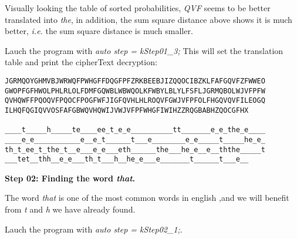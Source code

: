 \begin{center}
\end{center}

\vspace{1em}

Visually looking the table of sorted probabilities, \textit{QVF} seems to be better translated into \textit{the}, in addition, the sum square distance above shows it is much better, \textit{i.e.} the sum square distance is much smaller.


Lauch the program with \textit{auto step = kStep01\_3;} This will set the translation table and print the cipherText decryption:

\begin{center}
\end{center}


\noindent
\begin{Verbatim}[frame=single]
JGRMQOYGHMVBJWRWQFPWHGFFDQGFPFZRKBEEBJIZQQOCIBZKLFAFGQVFZFWWEO
GWOPFGFHWOLPHLRLOLFDMFGQWBLWBWQOLKFWBYLBLYLFSFLJGRMQBOLWJVFPFW
QVHQWFFPQOQVFPQOCFPOGFWFJIGFQVHLHLROQVFGWJVFPFOLFHGQVQVFILEOGQ
ILHQFQGIQVVOSFAFGBWQVHQWIJVWJVFPFWHGFIWIHZZRQGBABHZQOCGFHX

____t_____h_____te____ee_t_e_e__________tt_______e_e_the_e____
____e_e___________e__e_t______t___e________e_e_____t_____he_e_
th_t_ee_t_the_t__e___e_e___eth______the___he_e__e__ththe_____t
___tet__thh__e_e___th_t___h__he_e___e_______t______t___e__
\end{Verbatim}

\vspace{1em}

\textbf{Step 02: Finding the word \textit{that}.}
\vspace{1em}
	
The word  \textit{that} is one of the most common words in english ,and we will benefit from \textit{t} and \textit{h} we have already found.

Lauch the program with \textit{auto step = kStep02\_1;}.

